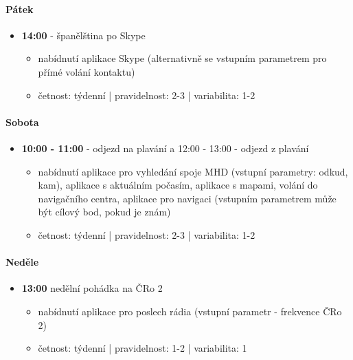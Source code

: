 \documentclass[thesis=M,czech]{FITthesis}[2012/06/26]
\begin{document}
\paragraph{Pátek}
\begin{itemize}
    \item \textbf{14:00} - španělština po Skype
\begin{itemize}
        \item nabídnutí aplikace Skype (alternativně se vstupním parametrem pro přímé volání kontaktu)

        \item četnost: týdenní | pravidelnost: 2-3 | variabilita: 1-2
\end{itemize}
\end{itemize}

\paragraph{Sobota}
\begin{itemize}
    \item \textbf{10:00 - 11:00} - odjezd na plavání a 12:00 - 13:00 - odjezd z plavání
\begin{itemize}
        \item nabídnutí aplikace pro vyhledání spoje MHD (vstupní parametry: odkud, kam), aplikace s aktuálním počasím, aplikace s mapami, volání do navigačního centra, aplikace pro navigaci (vstupním parametrem může být cílový bod, pokud je znám)

        \item četnost: týdenní | pravidelnost: 2-3 | variabilita: 1-2
\end{itemize}
\end{itemize}

\paragraph{Neděle}
\begin{itemize}
    \item \textbf{13:00} nedělní pohádka na ČRo 2
\begin{itemize}
        \item nabídnutí aplikace pro poslech rádia (vstupní parametr - frekvence ČRo 2)

        \item četnost: týdenní | pravidelnost: 1-2 | variabilita: 1
\end{itemize}
\end{itemize}
\end{document}
